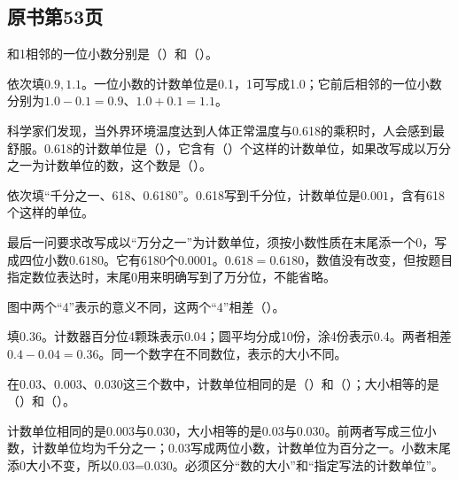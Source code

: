 

\subsection*{原书第53页}

和1相邻的一位小数分别是（\hspace{1.8em}）和（\hspace{1.8em}）。\par
\begin{BookAnswer}
依次填\(0.9,1.1\)。一位小数的计数单位是0.1，1可写成1.0；它前后相邻的一位小数分别为\(1.0-0.1=0.9\)、\(1.0+0.1=1.1\)。
\end{BookAnswer}

科学家们发现，当外界环境温度达到人体正常温度与0.618的乘积时，人会感到最舒服。0.618的计数单位是（\hspace{1.8em}），它含有（\hspace{1.8em}）个这样的计数单位，如果改写成以万分之一为计数单位的数，这个数是（\hspace{1.8em}）。\par
\begin{BookAnswer}
依次填“千分之一、618、0.6180”。0.618写到千分位，计数单位是\(0.001\)，含有618个这样的单位。\par 最后一问要求改写成以“万分之一”为计数单位，须按小数性质在末尾添一个0，写成四位小数\(0.6180\)。它有6180个\(0.0001\)。\(0.618=0.6180\)，数值没有改变，但按题目指定数位表达时，末尾0用来明确写到了万分位，不能省略。
\end{BookAnswer}

图中两个“4”表示的意义不同，这两个“4”相差（\hspace{1.8em}）。\par
{}
\begin{BookAnswer}
填\(0.36\)。计数器百分位4颗珠表示0.04；圆平均分成10份，涂4份表示0.4。两者相差\(0.4-0.04=0.36\)。同一个数字在不同数位，表示的大小不同。
\end{BookAnswer}

在0.03、0.003、0.030这三个数中，计数单位相同的是（\hspace{1.8em}）和（\hspace{1.8em}）；大小相等的是（\hspace{1.8em}）和（\hspace{1.8em}）。\par
\begin{BookAnswer}
计数单位相同的是\(0.003\)与\(0.030\)，大小相等的是\(0.03\)与\(0.030\)。前两者写成三位小数，计数单位均为千分之一；0.03写成两位小数，计数单位为百分之一。小数末尾添0大小不变，所以0.03=0.030。必须区分“数的大小”和“指定写法的计数单位”。
\end{BookAnswer}

